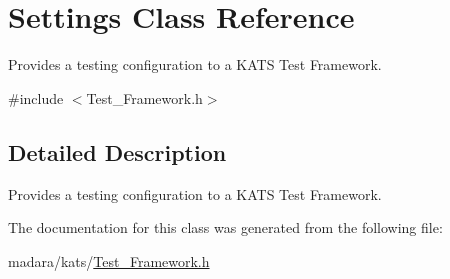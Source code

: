 \hypertarget{classSettings}{
\section{Settings Class Reference}
\label{df/d9a/classSettings}
}


Provides a testing configuration to a KATS Test Framework.  




{\ttfamily \#include $<$Test\_\-Framework.h$>$}



\subsection{Detailed Description}
Provides a testing configuration to a KATS Test Framework. 

The documentation for this class was generated from the following file:\begin{DoxyCompactItemize}
\item 
madara/kats/\hyperlink{Test__Framework_8h}{Test\_\-Framework.h}\end{DoxyCompactItemize}
